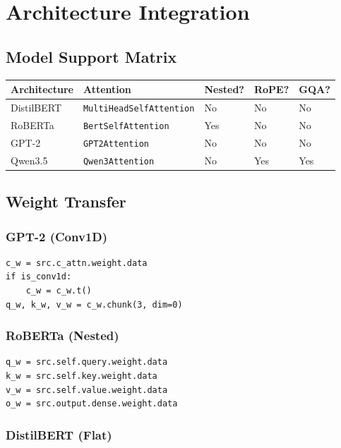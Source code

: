 
\section{Architecture Integration}

\subsection{Model Support Matrix}

\begin{table}[H]
\centering
\small
\begin{tabular}{lllll}
\toprule
\textbf{Architecture} & \textbf{Attention} & \textbf{Nested?} & \textbf{RoPE?} & \textbf{GQA?} \\
\midrule
DistilBERT & \texttt{MultiHeadSelfAttention} & No & No & No \\
RoBERTa & \texttt{BertSelfAttention} & Yes & No & No \\
GPT-2 & \texttt{GPT2Attention} & No & No & No \\
Qwen3.5 & \texttt{Qwen3Attention} & No & Yes & Yes \\
\bottomrule
\end{tabular}
\end{table}

\subsection{Weight Transfer}

\subsubsection{GPT-2 (Conv1D)}

\begin{lstlisting}
c_w = src.c_attn.weight.data
if is_conv1d:
    c_w = c_w.t()
q_w, k_w, v_w = c_w.chunk(3, dim=0)
\end{lstlisting}

\subsubsection{RoBERTa (Nested)}

\begin{lstlisting}
q_w = src.self.query.weight.data
k_w = src.self.key.weight.data
v_w = src.self.value.weight.data
o_w = src.output.dense.weight.data
\end{lstlisting}

\subsubsection{DistilBERT (Flat)}

